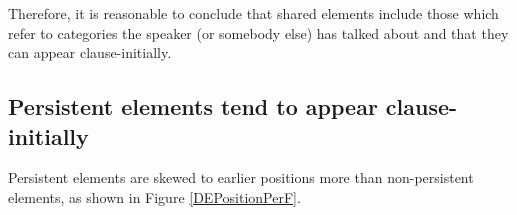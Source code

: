 Therefore, it is reasonable to conclude that
shared elements include those which refer to categories the speaker (or somebody else) has talked about and that
they can appear clause-initially.


\subsection{Persistent elements tend to appear clause-initially}\label{PersistentAppearClause-Initially}

Persistent elements are skewed to earlier positions more than non-persistent elements,
as shown in Figure \ref{DEPositionPerF}.


